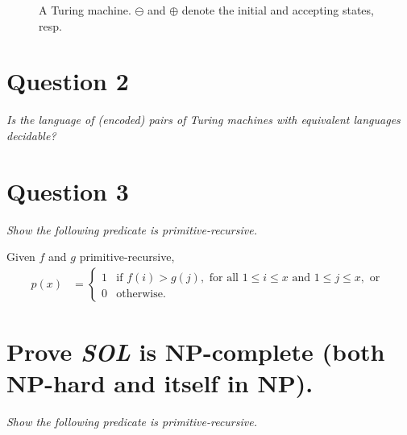 \documentclass[a4paper]{article}
\begin{document}
\begin{figure}[h]
\begin{center}
\begin{tikzpicture}[shorten >=1pt,node distance=2.2cm,on grid,auto]
\end{tikzpicture}

  \end{center}
  \caption{A Turing machine.
     $\ominus$ and $\oplus$ denote the initial and accepting states, resp. 
  }\label{fig:tm}
\end{figure}

\section*{Question 2}
\begin{center}
  \textit{Is the language of (encoded) pairs of Turing machines with equivalent languages decidable?}
\end{center}

\section*{Question 3}
\begin{center}
  \textit{Show the following predicate is primitive-recursive.}
\end{center}
Given $f$ and $g$ primitive-recursive,
\begin{align*}
  p(x) &= \begin{cases}
    1 & \text{if } f(i) > g(j),\text{ for all } 1 \le i \le x \text{ and } 1 \le j \le x,\text{ or } \\
    0 & \text{otherwise.}
  \end{cases}
\end{align*}

\section*{Prove \textit{SOL} is NP-complete (both NP-hard and itself in NP).}
\begin{center}
  \textit{Show the following predicate is primitive-recursive.}
\end{center}
\end{document}
